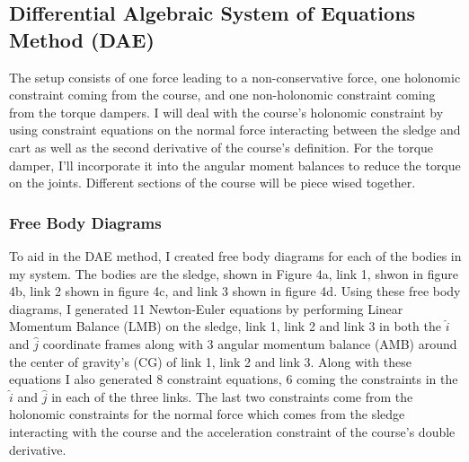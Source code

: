 \documentclass{article}
\begin{document}
\subsection{Differential Algebraic System of Equations Method (DAE)}
The setup consists of one force leading to a non-conservative force, one holonomic constraint coming from the course, and one non-holonomic constraint coming from the torque dampers. I will deal with the course's holonomic constraint by using constraint equations on the normal force interacting between the sledge and cart as well as the second derivative of the course's definition. For the torque damper, I’ll incorporate it into the angular moment balances to reduce the torque on the joints. Different sections of the course will be piece wised together. \\
\subsubsection{Free Body Diagrams}
To aid in the DAE method, I created free body diagrams for each of the bodies in my system. The bodies are the sledge, shown in Figure 4a, link 1, shwon in figure 4b, link 2 shown in figure 4c, and link 3 shown in figure 4d. Using these free body diagrams, I generated 11 Newton-Euler equations by performing Linear Momentum Balance (LMB) on the sledge, link 1, link 2 and link 3 in both the $\hat{i}$ and $\hat{j}$ coordinate frames along with 3 angular momentum balance (AMB) around the center of gravity's (CG) of link 1, link 2 and link 3. Along with these equations I also generated 8 constraint equations, 6 coming the constraints in the $\hat{i}$ and $\hat{j}$ in each of the three links. The last two constraints come from the holonomic constraints for the normal force which comes from the sledge interacting with the course and the acceleration constraint of the course's double derivative.
\end{document}
